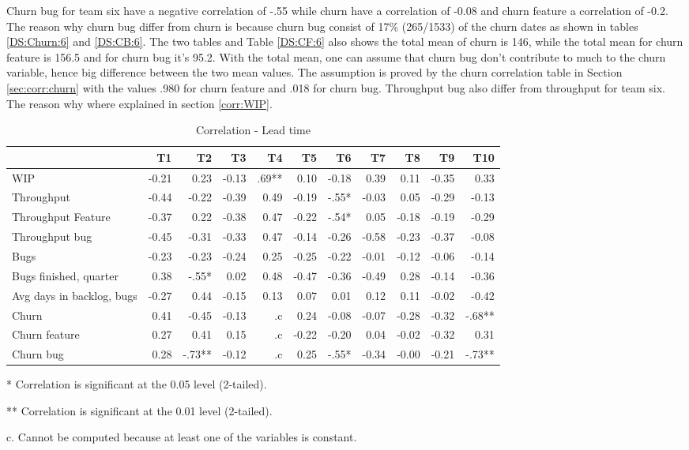 \documentclass[UKenglish]{ifimaster}  %
\begin{document}
Churn bug for team six have a negative correlation of -.55 while churn have a correlation of -0.08 and churn feature a correlation of -0.2. The reason why churn bug differ from churn is because churn bug consist of 17\% (265/1533) of the churn dates as shown in tables \ref{DS:Churn:6} and \ref{DS:CB:6}. The two tables and Table \ref{DS:CF:6} also shows the total mean of churn is 146, while the total mean for churn feature is 156.5 and for churn bug it's 95.2. With the total mean, one can assume that churn bug don't contribute to much to the churn variable, hence big difference between the two mean values. The assumption is proved by the churn correlation table in Section \ref{sec:corr:churn} with the values .980 for churn feature and .018 for churn bug. Throughput bug also differ from throughput for team six. The reason why where explained in section \ref{corr:WIP}. 
\begin{table}[!htbp]
 \begin{adjustwidth}{-2.5cm}{}
 \centering
 \begin{tabular}{|l|r|r|r|r|r|r|r|r|r|r|}
\hline
 & \bf{T1} & \bf{T2} & \bf{T3} & \bf{T4} & \bf{T5} & \bf{T6} & \bf{T7} & \bf{T8} & \bf{T9} & \bf{T10}\\ \hline
WIP &-0.21& 0.23& -0.13& .69**& 0.10& -0.18& 0.39& 0.11& -0.35& 0.33\\ \hline
Throughput &-0.44& -0.22& -0.39& 0.49& -0.19& -.55*& -0.03& 0.05& -0.29& -0.13\\ \hline
Throughput Feature &-0.37& 0.22& -0.38& 0.47& -0.22& -.54*& 0.05& -0.18& -0.19& -0.29\\ \hline
Throughput bug &-0.45& -0.31& -0.33& 0.47& -0.14& -0.26& -0.58& -0.23& -0.37& -0.08\\ \hline
Bugs &-0.23& -0.23& -0.24& 0.25& -0.25& -0.22& -0.01& -0.12& -0.06& -0.14\\ \hline
Bugs finished, quarter &0.38& -.55*& 0.02& 0.48& -0.47& -0.36& -0.49& 0.28& -0.14& -0.36\\ \hline
Avg days in backlog, bugs &-0.27& 0.44& -0.15& 0.13& 0.07& 0.01& 0.12& 0.11& -0.02& -0.42\\ \hline
Churn &0.41& -0.45& -0.13& .c& 0.24& -0.08& -0.07& -0.28& -0.32& -.68**\\ \hline
Churn feature &0.27& 0.41& 0.15& .c& -0.22& -0.20& 0.04& -0.02& -0.32& 0.31\\ \hline
Churn bug &0.28& -.73**
& -0.12& .c
& 0.25& -.55*
& -0.34& -0.00& -0.21& -.73**
\\ \hline
\end{tabular}
 \caption{Correlation - Lead time}
 \label{corr:Lead time}
 \centerline {* Correlation is significant at the 0.05 level (2-tailed).}
\centerline{** Correlation is significant at the 0.01 level (2-tailed).}
\centerline{c. Cannot be computed because at least one of the variables is constant.}
\end{adjustwidth}
\end{table}
\end{document}
